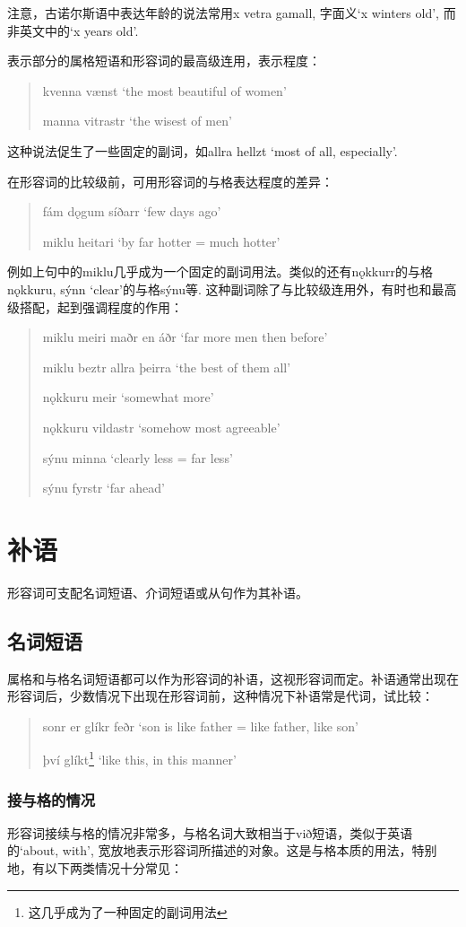 注意，古诺尔斯语中表达年龄的说法常用x vetra gamall, 字面义`x winters old', 而非英文中的`x years old'.

表示部分的属格短语和形容词的最高级连用，表示程度：
\begin{quote}
    kvenna vænst `the most beautiful of women'

    manna vitrastr `the wisest of men'
\end{quote}
这种说法促生了一些固定的副词，如allra hellzt `most of all, especially'.

在形容词的比较级前，可用形容词的与格表达程度的差异：
\begin{quote}
    fám dǫgum síðarr `few days ago'

    miklu heitari `by far hotter = much hotter'
\end{quote}
例如上句中的miklu几乎成为一个固定的副词用法。类似的还有nǫkkurr的与格nǫkkuru, sýnn `clear'的与格sýnu等. 这种副词除了与比较级连用外，有时也和最高级搭配，起到强调程度的作用：
\begin{quote}
    miklu meiri maðr en áðr `far more men then before'

    miklu beztr allra þeirra `the best of them all'

    nǫkkuru meir `somewhat more'

    nǫkkuru vildastr `somehow most agreeable'

    sýnu minna `clearly less = far less'

    sýnu fyrstr `far ahead'
\end{quote}

\section{补语}
形容词可支配名词短语、介词短语或从句作为其补语。
\subsection{名词短语}
属格和与格名词短语都可以作为形容词的补语，这视形容词而定。补语通常出现在形容词后，少数情况下出现在形容词前，这种情况下补语常是代词，试比较：
\begin{quote}
    sonr er glíkr feðr `son is like father = like father, like son'

    því glíkt\footnote{这几乎成为了一种固定的副词用法} `like this, in this manner'
\end{quote}
\subsubsection*{接与格的情况}
形容词接续与格的情况非常多，与格名词大致相当于við短语，类似于英语的`about, with', 宽放地表示形容词所描述的对象。这是与格本质的用法，特别地，有以下两类情况十分常见：


